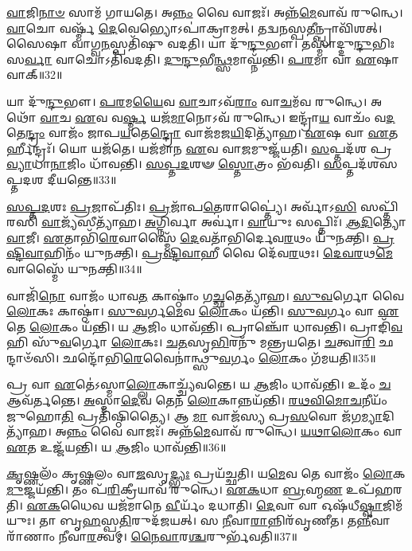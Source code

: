 \-\ul{𑌵𑌾}\-𑌜𑌿\-\ul{𑌨𑌾}\-\-\ul{𑍞} 𑌸𑌾𑌮᳴ 𑌗𑌾𑌯𑌤𑍇।
𑌅\-\ul{𑌨𑍍𑌨𑌂} 𑌵𑍈 𑌵𑌾𑌜𑌃᳴।
𑌅𑌨𑍍𑌨᳴\-\ul{𑌮𑍇}\-𑌵𑌾𑌵᳴ 𑌰𑍁𑌨𑍍𑌧𑍇।
\-\ul{𑌵𑌾}\-𑌚𑍋 𑌵𑌰𑍍𑌷𑍍𑌮᳴ \ul{𑌦𑍇}\-𑌵𑍇𑌭𑍍𑌯𑍋\-𑌽𑌪𑌾॑𑌕𑍍𑌰𑌾𑌮𑌤𑍍।
𑌤𑌦𑍍𑌵\-\ul{𑌨}\-𑌸𑍍𑌪\-\ul{𑌤𑍀}\-𑌨𑍍𑌪𑍍𑌰𑌾𑌵𑌿᳴𑌶𑌤𑍍।
𑌸𑍈𑌷𑌾 𑌵𑌾𑌗𑍍𑌵\-\ul{𑌨}\-𑌸𑍍𑌪𑌤𑌿᳴𑌷𑍁 𑌵𑌦𑌤𑌿।
𑌯𑌾 𑌦𑍁᳴\-\ul{𑌨𑍍𑌦𑍁}\-𑌭𑍗।
𑌤𑌸𑍍𑌮𑌾॑𑌦𑍍𑌦𑍁\-\ul{𑌨𑍍𑌦𑍁}\-𑌭𑌿𑌃 𑌸\-\ul{𑌰𑍍𑌵𑌾} 𑌵𑌾𑌚𑍋\-𑌽𑌤𑌿᳴𑌵𑌦𑌤𑌿।
\-\ul{𑌦𑍁}\-\-\ul{𑌨𑍍𑌦𑍁}\-𑌭𑍀\-\ul{𑌨𑍍𑌥𑍍𑌸}\-𑌮𑌾𑌘𑍍𑌨᳴𑌨𑍍𑌤𑌿।
\-\ul{𑌪}\-\-\ul{𑌰}\-𑌮𑌾 𑌵𑌾 \ul{𑌏}\-𑌷𑌾 𑌵𑌾𑌕𑍍॥32॥

𑌯𑌾 𑌦𑍁᳴\-\ul{𑌨𑍍𑌦𑍁}\-𑌭𑍗।
\-\ul{𑌪}\-\-\ul{𑌰}\-𑌮\-\ul{𑌯𑍈}\-𑌵 \ul{𑌵𑌾}\-𑌚𑌾\-𑌽𑌵᳴\-\ul{𑌰𑌾𑌂} 𑌵𑌾\-\ul{𑌚}\-𑌮᳴𑌵 𑌰𑍁𑌨𑍍𑌧𑍇।
𑌅𑌥𑍋᳴ \ul{𑌵𑌾}\-𑌚 \ul{𑌏}\-𑌵 𑌵\-\ul{𑌰𑍍𑌷𑍍𑌮} 𑌯𑌜᳴\-\ul{𑌮𑌾}\-𑌨𑍋\-𑌽𑌵᳴ 𑌰𑍁𑌨𑍍𑌧𑍇।
𑌇𑌨𑍍𑌦𑍍𑌰𑌾᳴\-\ul{𑌯} 𑌵𑌾𑌚𑌂᳴ 𑌵\-\ul{𑌦}\-𑌤𑍇\-\ul{𑌨𑍍𑌦𑍍𑌰𑌂} 𑌵𑌾𑌜𑌂᳴ 𑌜𑌾𑌪\-\ul{𑌯}\-𑌤𑍇\-\ul{𑌨𑍍𑌦𑍍𑌰𑍋} 𑌵𑌾𑌜᳴𑌮𑌜\-\ul{𑌯𑌿}\-𑌦𑌿𑌤𑍍𑌯𑌾᳴𑌹।
\-\ul{𑌏}\-𑌷 𑌵𑌾 \ul{𑌏}\-𑌤𑌰𑍍\mbox{}𑌹𑍀𑌨𑍍𑌦𑍍𑌰𑌃᳴।
𑌯𑍋 𑌯𑌜᳴𑌤𑍇।
𑌯𑌜᳴𑌮𑌾𑌨 \ul{𑌏}\-𑌵 𑌵𑌾\-\ul{𑌜}\-𑌮𑍁𑌜𑍍𑌜᳴𑌯𑌤𑌿।
\-\ul{𑌸}\-𑌪𑍍𑌤𑌦᳴𑌶 𑌪𑍍𑌰\-\ul{𑌵𑍍𑌯𑌾}\-𑌧𑌾\-\ul{𑌨𑌾}\-𑌜𑌿𑌂 𑌧𑌾᳴𑌵𑌨𑍍𑌤𑌿।
\-\ul{𑌸}\-\-\ul{𑌪𑍍𑌤}\-\-\ul{𑌦}\-𑌶𑍟 \ul{𑌸𑍍𑌤𑍋}\-𑌤𑍍𑌰𑌂 𑌭᳴𑌵𑌤𑌿।
\-\ul{𑌸}\-𑌪𑍍𑌤𑌦᳴𑌶𑌸𑌪𑍍𑌤𑌦𑌶 𑌦𑍀𑌯𑌨𑍍𑌤𑍇॥33॥

\-\ul{𑌸}\-\-\ul{𑌪𑍍𑌤}\-\-\ul{𑌦}\-𑌶𑌃 \ul{𑌪𑍍𑌰}\-𑌜𑌾\-𑌪᳴𑌤𑌿𑌃।
\-\ul{𑌪𑍍𑌰}\-𑌜𑌾᳴𑌪\-\ul{𑌤𑍇}\-𑌰𑌾𑌪𑍍𑌤𑍍𑌯𑍈॑।
𑌅𑌰𑍍𑌵𑌾᳴𑌽\-\ul{𑌸𑌿} 𑌸𑌪𑍍𑌤𑌿᳴𑌰𑌸𑌿 \ul{𑌵𑌾}\-𑌜𑍍𑌯᳴𑌸𑍀𑌤𑍍𑌯𑌾᳴𑌹।
\-\ul{𑌅}\-𑌗𑍍𑌨𑌿𑌰𑍍𑌵𑌾 𑌅𑌰𑍍𑌵𑌾॑।
\-\ul{𑌵𑌾}\-𑌯𑍁𑌃 𑌸𑌪𑍍𑌤𑌿𑌃᳴।
\-\ul{𑌆}\-\-\ul{𑌦𑌿}\-𑌤𑍍𑌯𑍋 \ul{𑌵𑌾}\-𑌜𑍀।
\-\ul{𑌏}\-𑌤𑌾𑌭𑌿᳴\-\ul{𑌰𑍇}\-𑌵𑌾𑌸𑍍𑌮𑍈᳴ \ul{𑌦𑍇}\-𑌵𑌤𑌾᳴𑌭𑌿𑌰𑍍𑌦𑍇𑌵\-\ul{𑌰}\-𑌥𑌂 𑌯𑍁᳴𑌨𑌕𑍍𑌤𑌿।
\-\ul{𑌪𑍍𑌰}\-\-\ul{𑌷𑍍𑌟𑌿}\-\-\ul{𑌵𑌾}\-𑌹𑌿𑌨𑌂᳴ 𑌯𑍁𑌨𑌕𑍍𑌤𑌿।
\-\ul{𑌪𑍍𑌰}\-\-\ul{𑌷𑍍𑌟𑌿}\-\-\ul{𑌵𑌾}\-𑌹𑍀 𑌵𑍈 𑌦𑍇᳴𑌵\-\ul{𑌰}\-𑌥𑌃।
\-\ul{𑌦𑍇}\-\-\ul{𑌵}\-\-\ul{𑌰}\-𑌥\-\ul{𑌮𑍇}\-𑌵𑌾𑌸𑍍𑌮𑍈᳴ 𑌯𑍁𑌨𑌕𑍍𑌤𑌿॥34॥

𑌵𑌾𑌜𑌿᳴\-\ul{𑌨𑍋} 𑌵𑌾𑌜𑌂᳴ 𑌧𑌾𑌵\-\ul{𑌤} 𑌕𑌾𑌷𑍍𑌠𑌾𑌂॑ 𑌗\-\ul{𑌚𑍍𑌛}\-𑌤𑍇𑌤𑍍𑌯𑌾᳴𑌹।
\-\ul{𑌸𑍁}\-\-\ul{𑌵}\-𑌰𑍍𑌗𑍋 𑌵𑍈 \ul{𑌲𑍋}\-𑌕𑌃 𑌕𑌾𑌷𑍍𑌠𑌾॑।
\-\ul{𑌸𑍁}\-\-\ul{𑌵}\-𑌰𑍍𑌗\-\ul{𑌮𑍇}\-𑌵 \ul{𑌲𑍋}\-𑌕𑌂 𑌯᳴𑌨𑍍𑌤𑌿।
\-\ul{𑌸𑍁}\-\-\ul{𑌵}\-𑌰𑍍𑌗𑌂 𑌵𑌾 \ul{𑌏}\-𑌤𑍇 \ul{𑌲𑍋}\-𑌕𑌂 𑌯᳴𑌨𑍍𑌤𑌿।
𑌯 \ul{𑌆}\-𑌜𑌿𑌂 𑌧𑌾𑌵᳴𑌨𑍍𑌤𑌿।
𑌪𑍍𑌰𑌾𑌞𑍍𑌚𑍋᳴ 𑌧𑌾𑌵𑌨𑍍𑌤𑌿।
𑌪𑍍𑌰𑌾𑌙𑌿᳴\-\ul{𑌵} 𑌹𑌿 𑌸𑍁᳴\-\ul{𑌵}\-𑌰𑍍𑌗𑍋 \ul{𑌲𑍋}\-𑌕𑌃।
\-\ul{𑌚}\-\-\ul{𑌤}\-𑌸𑍃\-\ul{𑌭𑌿}\-𑌰𑌨𑍁᳴ 𑌮𑌨𑍍𑌤𑍍𑌰𑌯𑌤𑍇।
\-\ul{𑌚}\-𑌤𑍍𑌵𑌾\-\ul{𑌰𑌿} 𑌛𑌨𑍍𑌦𑌾𑍞᳴𑌸𑌿।
𑌛𑌨𑍍𑌦𑍋᳴𑌭𑌿\-\ul{𑌰𑍇}\-𑌵𑍈𑌨𑌾॑𑌨𑍍𑌥𑍍𑌸𑍁\-\ul{𑌵}\-𑌰𑍍𑌗𑌂 \ul{𑌲𑍋}\-𑌕𑌂 𑌗᳴𑌮𑌯𑌤𑌿॥35॥

𑌪𑍍𑌰 𑌵𑌾 \ul{𑌏}\-𑌤𑍇॑\-𑌽𑌸𑍍𑌮𑌾\-\ul{𑌲𑍍𑌲𑍋}\-𑌕𑌾𑌚𑍍𑌚𑍍𑌯᳴𑌵𑌨𑍍𑌤𑍇।
𑌯 \ul{𑌆}\-𑌜𑌿𑌂 𑌧𑌾𑌵᳴𑌨𑍍𑌤𑌿।
𑌉𑌦𑌂᳴ \ul{𑌚} 𑌆𑌵᳴𑌰𑍍𑌤𑌨𑍍𑌤𑍇।
\-\ul{𑌅}\-𑌸𑍍𑌮𑌾\-\ul{𑌦𑍇}\-𑌵 𑌤𑍇𑌨᳴ \ul{𑌲𑍋}\-𑌕𑌾𑌨𑍍𑌨𑌯᳴𑌨𑍍𑌤𑌿।
\-\ul{𑌰}\-\-\ul{𑌥}\-\-\ul{𑌵𑌿}\-\-\ul{𑌮𑍋}\-\-\ul{𑌚}\-𑌨𑍀𑌯𑌂᳴ 𑌜𑍁𑌹𑍋\-\ul{𑌤𑌿} 𑌪𑍍𑌰𑌤𑌿᳴\-𑌷𑍍𑌠𑌿𑌤𑍍𑌯𑍈।
𑌆 \ul{𑌮𑌾} 𑌵𑌾𑌜᳴𑌸𑍍𑌯 𑌪𑍍𑌰\-\ul{𑌸}\-𑌵𑍋 𑌜᳴𑌗\-\ul{𑌮𑍍𑌯𑌾}\-𑌦𑌿𑌤𑍍𑌯𑌾᳴𑌹।
𑌅\-\ul{𑌨𑍍𑌨𑌂} 𑌵𑍈 𑌵𑌾𑌜𑌃᳴।
𑌅𑌨𑍍𑌨᳴\-\ul{𑌮𑍇}\-𑌵𑌾𑌵᳴ 𑌰𑍁𑌨𑍍𑌧𑍇।
\-\ul{𑌯}\-\-\ul{𑌥𑌾}\-\-\ul{𑌲𑍋}\-𑌕𑌂 𑌵𑌾 \ul{𑌏}\-𑌤 𑌉𑌜𑍍𑌜᳴𑌯𑌨𑍍𑌤𑌿।
𑌯 \ul{𑌆}\-𑌜𑌿𑌂 𑌧𑌾𑌵᳴𑌨𑍍𑌤𑌿॥36॥

\-\ul{𑌕𑍃}\-𑌷𑍍𑌣𑌲𑌂᳴ 𑌕𑍃𑌷𑍍𑌣𑌲𑌂 𑌵𑌾\-\ul{𑌜}\-𑌸𑍃\-\ul{𑌦𑍍𑌭𑍍𑌯𑌃} 𑌪𑍍𑌰𑌯᳴𑌚𑍍𑌛𑌤𑌿।
𑌯\-\ul{𑌮𑍇}\-𑌵 𑌤𑍇 𑌵𑌾𑌜𑌂᳴ \ul{𑌲𑍋}\-𑌕\-\ul{𑌮𑍁}\-𑌜𑍍𑌜𑌯᳴𑌨𑍍𑌤𑌿।
𑌤𑌂 𑌪᳴\-\ul{𑌰𑌿}\-𑌕𑍍𑌰𑍀𑌯𑌾𑌵᳴ 𑌰𑍁𑌨𑍍𑌧𑍇।
\-\ul{𑌏}\-\-\ul{𑌕}\-𑌧𑌾 \ul{𑌬𑍍𑌰}\-𑌹𑍍𑌮\-\ul{𑌣} 𑌉𑌪᳴𑌹𑌰𑌤𑌿।
\-\ul{𑌏}\-\-\ul{𑌕}\-𑌧𑍈𑌵 𑌯𑌜᳴𑌮𑌾𑌨𑍇 \ul{𑌵𑍀}\-𑌰𑍍𑌯𑌂᳴ 𑌦𑌧𑌾𑌤𑌿।
\-\ul{𑌦𑍇}\-𑌵𑌾 𑌵𑌾 𑌓𑌷᳴𑌧𑍀\-\ul{𑌷𑍍𑌵𑌾}\-𑌜𑌿𑌮᳴𑌯𑍁𑌃।
𑌤𑌾 𑌬𑍃\-\ul{𑌹}\-𑌸𑍍𑌪\-\ul{𑌤𑌿}\-𑌰𑍁𑌦᳴𑌜𑌯𑌤𑍍।
𑌸 \ul{𑌨𑍀}\-𑌵𑌾\-\ul{𑌰𑌾}\-𑌨𑍍𑌨𑌿𑌰᳴𑌵𑍃𑌣𑍀𑌤।
𑌤\-\ul{𑌨𑍍𑌨𑍀}\-𑌵𑌾𑌰𑌾᳴𑌣𑌾𑌂 𑌨𑍀𑌵𑌾\-\ul{𑌰}\-𑌤𑍍𑌵𑌮𑍍।
\-\ul{𑌨𑍈}\-\-\ul{𑌵𑌾}\-𑌰\-\ul{𑌶𑍍𑌚}\-𑌰𑍁𑌰𑍍𑌭᳴𑌵𑌤𑌿॥37॥

